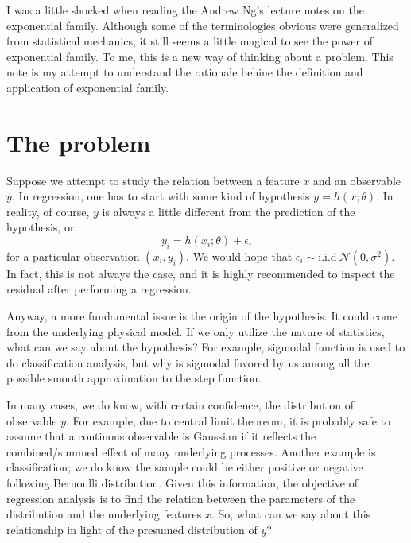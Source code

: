 I was a little shocked when reading the Andrew Ng's lecture notes on the exponential family. Although some of the
terminologies obvious were generalized from statistical mechanics, it still seems a little magical to see the power of
exponential family. To me, this is a new way of thinking about a problem. This note is my attempt to understand
the rationale behine the definition and application of exponential family.

\section{The problem}
Suppose we attempt to study the relation between a feature $x$ and an observable $y$. In regression, one has to start with some kind of hypothesis $y=h(x; \theta)$. In reality, of course, $y$ is always a little different from the prediction of the hypothesis, or,
\begin{equation}
y_i = h(x_i;\theta) + \epsilon_i
\end{equation}
for a particular observation $(x_i, y_i)$. We would hope that $\epsilon_i\sim\mathrm{i.i.d}\ \mathcal{N}(0, \sigma^2)$.
In fact, this is not always the case, and it is highly recommended to inspect the residual after performing a regression.

Anyway, a more fundamental issue is the origin of the hypothesis. It could come from the underlying physical model. If we only utilize the nature of statistics, what can we say about the hypothesis? For example, sigmodal function is used to do classification analysis, but why is sigmodal favored by us among all the possible smooth approximation to the step function.

In many cases, we do know, with certain confidence, the distribution of observable $y$. For example, due to central limit theoreom, it is probably safe to assume that a continous observable is Gaussian if it reflects the combined/summed effect of many underlying processes. Another example is classification; we do know the sample could be either positive or negative following Bernoulli distribution. Given this information, the objective of regression analysis is to find the relation between the parameters of the distribution and the underlying features $x$. So, what can we say about this relationship in light of the presumed distribution of $y$? 


